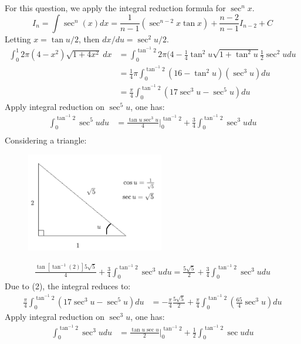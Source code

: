 \documentclass{article}
\begin{document}
\begin{enumerate}[label=\alph*)]
    For this question, we apply the integral reduction formula for $\sec^nx$.
    \begin{equation*}
        I_n=\int\sec^n(x)dx=\frac{1}{n-1}(\sec^{n-2}x\tan x)+\frac{n-2}{n-1}I_{n-2}+C
    \end{equation*}
    Letting $x=\tan u/2$, then $dx/du=\sec^2u/2$.
    \begin{align*}
        \int_0^1 2\pi(4-x^2)\sqrt{1+4x^2}\ dx &=\int^{\tan^{-1}2}_0 2\pi(4-\frac{1}{4}\tan^2u\sqrt{1+\tan^2u}\frac{1}{2}\sec^2u du
        \\
        &=\frac{1}{4}\pi \int^{\tan^{-1}2}_0 (16-\tan^2u)(\sec^3u)du \\
        &=\frac{\pi}{4} \int^{\tan^{-1}2}_0 (17\sec^3u-\sec^5u) du
    \end{align*}
    Apply integral reduction on $\sec^5u$, one has:
    \begin{align*}
        \int^{\tan^{-1}2}_0 \sec^5udu &= \frac{\tan u \sec^3u}{4}\Big|^{\tan^{-1}2}_0+\frac{3}{4}\int^{\tan^{-1}2}_0 \sec^3u du\\
    \end{align*}
    Considering a triangle: 
        \begin{figure}[H]
            \includegraphics[width=6cm]{qn4b.png}
            \centering
        \end{figure}
    \begin{align}
        \frac{\tan[\tan^{-1}(2)]5\sqrt{5}}{4}+\frac34\int^{\tan^{-1}2}_0 \sec^3u du=\frac{5\sqrt{5}}{2}+\frac34\int^{\tan^{-1}2}_0 \sec^3u du
    \end{align}
    Due to (2), the integral reduces to:
    \begin{align}
        \frac{\pi}{4} \int^{\tan^{-1}2}_0 (17\sec^3u-\sec^5u) du&=-\frac{\pi}{4}\frac{5\sqrt{5}}{2} + \frac{\pi}{4}\int^{\tan^{-1}2}_0 \left(\frac{65}{4}\sec^3u\right) du
    \end{align}
    Apply integral reduction on $\sec^3u$, one has:
    \begin{align*}
        \int^{\tan^{-1}2}_0 \sec^3udu &= \frac{\tan u \sec u}{2}\Big|^{\tan^{-1}2}_0+\frac{1}{2}\int^{\tan^{-1}2}_0 \sec u du\\

\end{align*}
\end{enumerate}
\end{document}

